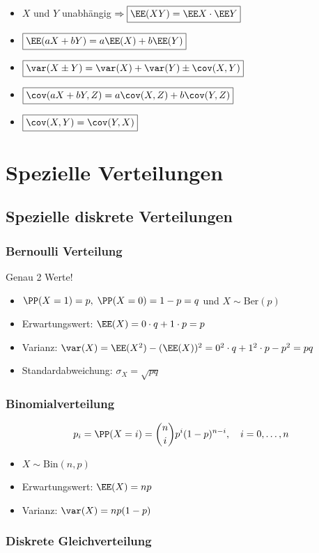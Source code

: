 \documentclass{scrreprt}
\begin{document}
\begin{itemize}
\item $X$ und $Y$ unabhängig $\Rightarrow \boxed{\EE(XY)=\EE X \cdot \EE Y}$
\end{itemize}

\begin{itemize}
\item $\boxed{\EE(aX+bY)=a\EE(X)+b\EE(Y)}$
\item $\boxed{\var(X\pm Y) = \var(X)+\var(Y)\pm \cov(X,Y)}$
\item $\boxed{\cov(aX+bY,Z)=a\cov(X,Z)+b\cov(Y,Z)}$
\item $\boxed{\cov(X,Y)=\cov(Y,X)}$
\end{itemize}

\section{Spezielle Verteilungen}
\subsection{Spezielle diskrete Verteilungen}
\subsubsection{Bernoulli Verteilung}
Genau 2 Werte!
\begin{itemize}
\item $\PP(X=1)=p, \; \PP(X=0)=1-p=q$ und $X \sim \mathrm{Ber}(p)$
\item Erwartungswert: $\EE(X)=0\cdot q + 1 \cdot p = p$
\item Varianz: $\var (X) = \EE(X^2) - (\EE(X))^2 = 0^2 \cdot q + 1^2 \cdot p - p^2 = pq$
\item Standardabweichung: $\sigma_X=\sqrt{pq}$
\end{itemize}
\subsubsection{Binomialverteilung}
$$p_i=\PP(X=i)=\binom{n}{i}p^i (1-p)^{n-i}, \quad i=0,\dots ,n$$
\begin{itemize}
\item $X \sim \mathrm{Bin}(n,p)$
\item Erwartungswert: $\EE(X)=np$
\item Varianz: $\var (X) = np (1-p)$
\end{itemize}

\subsubsection{Diskrete Gleichverteilung}
\end{document}
